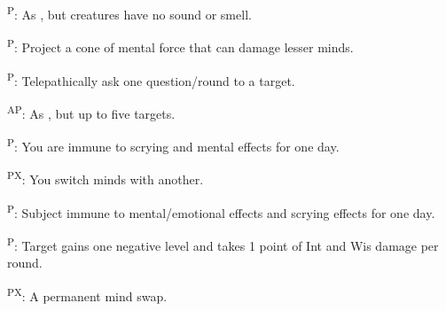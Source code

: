 \begin{enumerate*}
      \textsuperscript{P}: As , but creatures have no sound or smell.

\item {}\textsuperscript{P}: Project a cone of mental force that can damage lesser minds.

      \textsuperscript{P}: Telepathically ask one question/round to a target.

\item {}\textsuperscript{AP}: As , but up to five targets.

      \textsuperscript{P}: You are immune to scrying and mental effects for one day.

      \textsuperscript{PX}: You switch minds with another.

\item {}\textsuperscript{P}: Subject immune to mental/emotional effects and scrying effects for one day.

      \textsuperscript{P}: Target gains one negative level and takes 1 point of Int and Wis damage per round.

\item {}\textsuperscript{PX}: A permanent mind swap.
\end{enumerate*}
